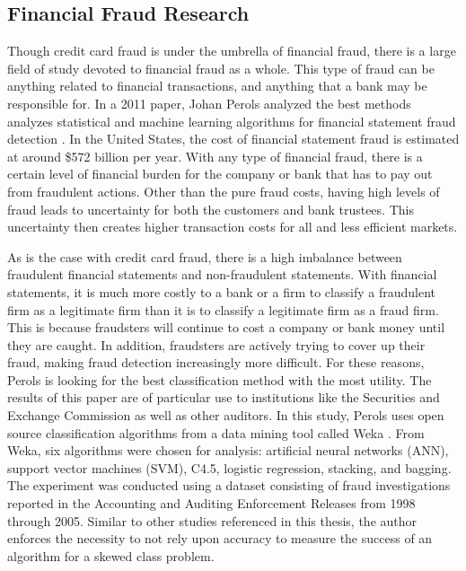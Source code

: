 \documentclass[midd]{thesis}
\begin{document}
\subsection{Financial Fraud Research}

Though credit card fraud is under the umbrella of financial fraud, there is a large field of study devoted to financial fraud as a whole. This type of fraud can be anything related to financial transactions, and anything that a bank may be responsible for. In a 2011 paper, Johan Perols analyzed the best methods analyzes statistical and machine learning algorithms for financial statement fraud detection \cite{Perols2011}. In the United States, the cost of financial statement fraud is estimated at around \$572 billion per year. With any type of financial fraud, there is a certain level of financial burden for the company or bank that has to pay out from fraudulent actions. Other than the pure fraud costs, having high levels of fraud leads to uncertainty for both the customers and bank trustees. This uncertainty then creates higher transaction costs for all and less efficient markets. 

As is the case with credit card fraud, there is a high imbalance between fraudulent financial statements and non-fraudulent statements. With financial statements, it is much more costly to a bank or a firm to classify a fraudulent firm as a legitimate firm than it is to classify a legitimate firm as a fraud firm. This is because fraudsters will continue to cost a company or bank money until they are caught. In addition, fraudsters are actively trying to cover up their fraud, making fraud detection increasingly more difficult. For these reasons, Perols is looking for the best classification method with the most utility. The results of this paper are of particular use to institutions like the Securities and Exchange Commission as well as other auditors. In this study, Perols uses open source classification algorithms from a data mining tool called Weka \cite{Perols2011}. From Weka, six algorithms were chosen for analysis: artificial neural networks (ANN), support vector machines (SVM), C4.5, logistic regression, stacking, and bagging. The experiment was conducted using a dataset consisting of fraud investigations reported in the Accounting and Auditing Enforcement Releases from 1998 through 2005. Similar to other studies referenced in this thesis, the author enforces the necessity to not rely upon accuracy to measure the success of an algorithm for a skewed class problem. 
\end{document}
